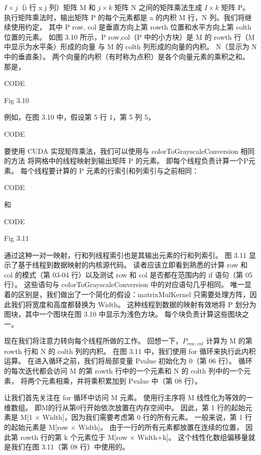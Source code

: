 $I \times j$（i 行 x j 列）矩阵 M 和 $j \times k$ 矩阵 N 之间的矩阵乘法生成 $I \times k$ 矩阵 P。
执行矩阵乘法时，输出矩阵 P 的每个元素都是 a 的内积 M 行，N 列。我们将继续使用约定，
其中 P row, col 是垂直方向上第 rowth 位置和水平方向上第 colth 位置的元素。 
如图 3.10 所示，P row,col（P 中的小方块）是 M 的 rowth 行（M 中显示为水平条）形成的向量
与 M 的 colth 列形成的向量的内积。 N（显示为 N 中的垂直条）。 
两个向量的内积（有时称为点积）是各个向量元素的乘积之和。 那是，

{\color{red} CODE}

{\color{red} Fig 3.10}

例如，在图 3.10 中，假设第 5 行 1，第 5 列 5，

{\color{red} CODE}

要使用 CUDA 实现矩阵乘法，我们可以使用与 colorToGrayscaleConversion 相同的方法
将网格中的线程映射到输出矩阵 P 的元素。 即每个线程负责计算一个P元素。 
每个线程要计算的 P 元素的行索引和列索引与之前相同：

{\color{red} CODE}

和

{\color{red} CODE}

{\color{red} Fig 3.11}

通过这种一对一映射，行和列线程索引也是其输出元素的行和列索引。 图 3.11 显示了基于线程到数据映射的内核源代码。 
读者应该立即看到熟悉的计算 row 和 col 的模式（第 03-04 行）以及测试 row 和 col 是否都在范围内的 if 语句（第 05 行）。 
这些语句与 colorToGrayscaleConversion 中的对应语句几乎相同。 
唯一显着的区别是，我们做出了一个简化的假设：matrixMulKernel 只需要处理方阵，因此我们将宽度和高度都替换为 Width。 
这种线程到数据的映射有效地将 P 划分为图块，其中一个图块在图 3.10 中显示为浅色方块。 每个块负责计算这些图块之一。

现在我们将注意力转向每个线程所做的工作。 回想一下，$P_{row,col}$ 计算为 M 的第 rowth 行和 N 的 colth 列的内积。
在图 3.11 中，我们使用 for 循环来执行此内积运算。 在进入循环之前，我们将局部变量 Pvalue 初始化为 0（第 06 行）。 
循环的每次迭代都会访问 M 的第 rowth 行中的一个元素和 N 的 colth 列中的一个元素，
将两个元素相乘，并将乘积累加到 Pvalue 中（第 08 行）。

让我们首先关注在 for 循环中访问 M 元素。 使用行主序将 M 线性化为等效的一维数组。 
即M的行从第0行开始依次放置在内存空间中。 因此，第 1 行的起始元素是 M[1 × Width]，因为我们需要考虑第 0 行的所有元素。
一般来说，第 1 行的起始元素是 M[row × Width]。 由于一行的所有元素都放置在连续的位置，
因此第 rowth 行的第 k 个元素位于 M[row × Width+k]。 这个线性化数组偏移量就是我们在图 3.11（第 08 行）中使用的。


